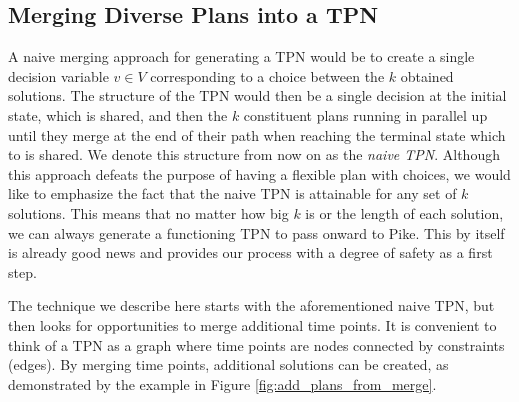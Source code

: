 \subsection{Merging Diverse Plans into a TPN}
\label{generating: merging}
A naive merging approach for generating a TPN would be to create a single decision variable $v \in V$ corresponding to a choice 
between the $k$ obtained solutions. 
The structure of the TPN would then be a single decision at the
initial state, which is shared, and then the $k$ constituent plans running in parallel
up until they merge at the end of their path when reaching the terminal state which to is shared.
We denote this structure from now on as the \textit{naive TPN}. 
Although this approach defeats the purpose of having a flexible plan with choices, we would like to emphasize 
the fact that the naive TPN is attainable for any set of $k$ solutions. This means that no matter how big $k$ is 
or the length of each solution, we can always generate a functioning TPN to pass onward to Pike.
This by itself is already good news and provides our process with a degree of safety as a first step. 
    
The technique we describe here starts with the aforementioned naive TPN, but then looks for opportunities to merge additional time points.
It is convenient to think of a TPN as a graph where time points are nodes connected by constraints (edges).
By merging time points, additional solutions can be created, as demonstrated by the example in Figure \ref{fig:add_plans_from_merge}.


